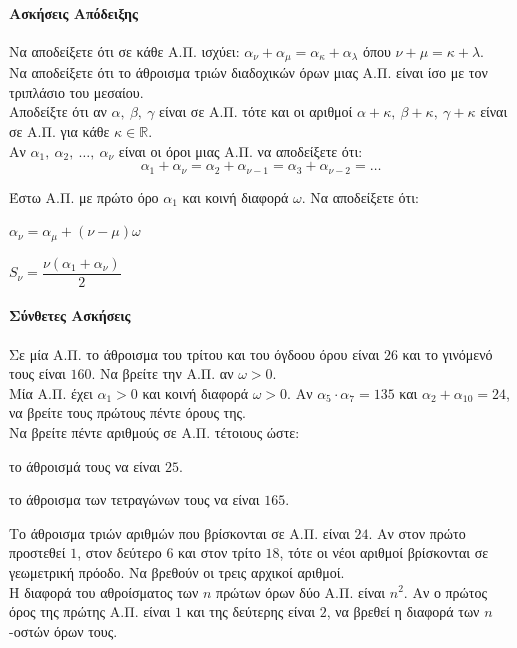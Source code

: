 \documentclass[11pt,a4paper,modern]{FFExercises}
\begin{document}
\paragraph{Ασκήσεις Απόδειξης}

\askhsh Να αποδείξετε ότι σε κάθε Α.Π. ισχύει: $\alpha_{\nu}+\alpha_{\mu}=\alpha_{\kappa}+\alpha_{\lambda}$ όπου $\nu+\mu=\kappa+\lambda$.\\

\askhsh Να αποδείξετε ότι το άθροισμα τριών διαδοχικών όρων μιας Α.Π. είναι ίσο με τον τριπλάσιο του μεσαίου.\\

\askhsh Αποδείξτε ότι αν $\alpha,\ \beta,\ \gamma$ είναι σε Α.Π. τότε και οι αριθμοί $\alpha+\kappa,\ \beta+\kappa,\ \gamma+\kappa$ είναι σε Α.Π. για κάθε $\kappa\in\mathbb{R}$.\\

\askhsh Αν $\alpha_1,\ \alpha_2,\ \ldots,\ \alpha_{\nu}$ είναι οι όροι μιας Α.Π. να αποδείξετε ότι: $$\alpha_1+\alpha_{\nu}=\alpha_2+\alpha_{\nu-1}=\alpha_3+\alpha_{\nu-2}=\ldots$$

\askhsh Έστω Α.Π. με πρώτο όρο $\alpha_1$ και κοινή διαφορά $\omega$. Να αποδείξετε ότι:
\begin{alist}
\item $\alpha_{\nu}=\alpha_{\mu}+(\nu-\mu)\omega$
\item $S_{\nu}=\dfrac{\nu(\alpha_1+\alpha_{\nu})}{2}$
\end{alist}

\paragraph{Σύνθετες Ασκήσεις}

\askhsh Σε μία Α.Π. το άθροισμα του τρίτου και του όγδοου όρου είναι $26$ και το γινόμενό τους είναι $160$. Να βρείτε την Α.Π. αν $\omega>0$.\\

\askhsh Μία Α.Π. έχει $\alpha_1>0$ και κοινή διαφορά $\omega>0$. Αν $\alpha_5\cdot\alpha_7=135$ και $\alpha_2+\alpha_{10}=24$, να βρείτε τους πρώτους πέντε όρους της.\\

\askhsh Να βρείτε πέντε αριθμούς σε Α.Π. τέτοιους ώστε:
\begin{alist}
\item το άθροισμά τους να είναι $25$.
\item το άθροισμα των τετραγώνων τους να είναι $165$.
\end{alist}

\askhsh Το άθροισμα τριών αριθμών που βρίσκονται σε Α.Π. είναι $24$. Αν στον πρώτο προστεθεί $1$, στον δεύτερο $6$ και στον τρίτο $18$, τότε οι νέοι αριθμοί βρίσκονται σε γεωμετρική πρόοδο. Να βρεθούν οι τρεις αρχικοί αριθμοί.\\

\askhsh Η διαφορά του αθροίσματος των $n$ πρώτων όρων δύο Α.Π. είναι $n^2$. Αν ο πρώτος όρος της πρώτης Α.Π. είναι $1$ και της δεύτερης είναι $2$, να βρεθεί η διαφορά των $n$-οστών όρων τους.\\
\end{document}
